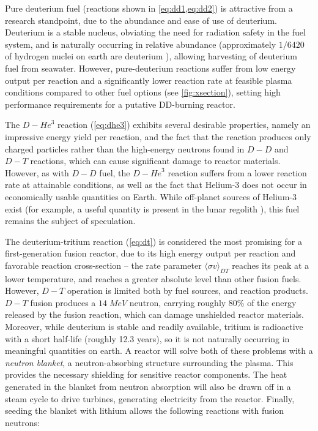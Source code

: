 Pure deuterium fuel (reactions shown in \cref{eq:dd1,eq:dd2}) is attractive from a research standpoint, due to the abundance and ease of use of deuterium.  Deuterium is a stable nucleus, obviating the need for radiation safety in the fuel system, and is naturally occurring in relative abundance (approximately $1/6420$ of hydrogen nuclei on earth are deuterium ), allowing harvesting of deuterium fuel from seawater.  However, pure-deuterium reactions suffer from low energy output per reaction and a significantly lower reaction rate at feasible plasma conditions compared to other fuel options (see \cref{fig:xsection}), setting high performance requirements for a putative DD-burning reactor.

The $\si{D}-\si{He}^3$ reaction (\cref{eq:dhe3}) exhibits several desirable properties, namely an impressive energy yield per reaction, and the fact that the reaction produces only charged particles rather than the high-energy neutrons found in $\si{D}-\si{D}$ and $\si{D}-\si{T}$ reactions, which can cause significant damage to reactor materials.  However, as with $\si{D}-\si{D}$ fuel, the $\si{D}-\si{He}^3$ reaction suffers from a lower reaction rate at attainable conditions, as well as the fact that Helium-3 does not occur in economically usable quantities on Earth.  While off-planet sources of Helium-3 exist (for example, a useful quantity is present in the lunar regolith ), this fuel remains the subject of speculation.

The deuterium-tritium reaction (\cref{eq:dt}) is considered the most promising for a first-generation fusion reactor, due to its high energy output per reaction and favorable reaction cross-section -- the rate parameter $\langle \sigma v \rangle_{DT}$ reaches its peak at a lower temperature, and reaches a greater absolute level than other fusion fuels.  However, $\si{D}-\si{T}$ operation is limited both by fuel sources, and reaction products.  $\si{D}-\si{T}$ fusion produces a $14 \;\si{MeV}$ neutron, carrying roughly 80\% of the energy released by the fusion reaction, which can damage unshielded reactor materials.  Moreover, while deuterium is stable and readily available, tritium is radioactive with a short half-life (roughly 12.3 years), so it is not naturally occurring in meaningful quantities on earth.   A reactor will solve both of these problems with a \emph{neutron blanket}, a neutron-absorbing structure surrounding the plasma.  This provides the necessary shielding for sensitive reactor 
components.  The heat generated in the blanket from neutron absorption will also be drawn off in a steam cycle to drive turbines, generating electricity from the reactor.  Finally, seeding the blanket with lithium allows the following reactions with fusion neutrons:

